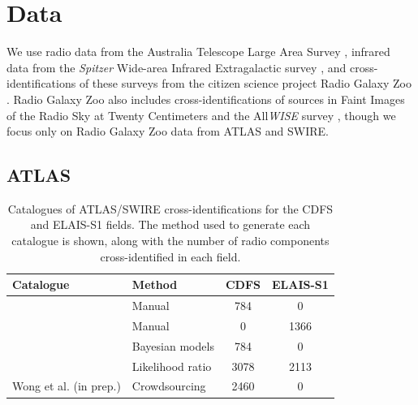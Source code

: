 \section{Data}\label{sec:atlas-xid-data}

  We use radio data from the Australia Telescope Large Area Survey
  \citep[ATLAS;][]{norris06,franzen15}, infrared data from the \emph{Spitzer}
  Wide-area Infrared Extragalactic survey \citep[SWIRE;][]{lonsdale03swire,
  surace05swire}, and cross-identifications of these surveys from the citizen
  science project Radio Galaxy Zoo \citep{banfield15}. Radio Galaxy Zoo also
  includes cross-identifications of sources in Faint Images of the Radio Sky at
  Twenty Centimeters \citep[FIRST;][]{white97first} and the All\emph{WISE}
  survey \citep{cutri2013wiseexplanatory}, though we focus only on Radio
  Galaxy Zoo data from ATLAS and SWIRE.

  \subsection{ATLAS}\label{sec:atlas-xid-atlas}
    \begin{table}
      \caption[Catalogues of ATLAS/SWIRE cross-identifications for the CDFS
        and ELAIS-S1 fields.]{Catalogues of ATLAS/SWIRE cross-identifications for the CDFS
        and ELAIS-S1 fields. The method used to generate each catalogue is
        shown, along with the number of radio components cross-identified in each
        field.}
      \centering
      \label{tab:atlas-cids}
      \begin{tabular}{llcc}
        \hline\hline
        Catalogue & Method & CDFS & ELAIS-S1\\
        \hline
        \citet{norris06} & Manual & 784 & 0\\
        \citet{middelberg08} & Manual & 0 & 1366\\
        \citet{fan15} & Bayesian models & 784 & 0\\
        \citet{weston18lrpy} & Likelihood ratio & 3078 & 2113\\
        Wong et al. (in prep.) & Crowdsourcing & 2460 & 0 \\
        \hline\hline
      \end{tabular}
    \end{table}

